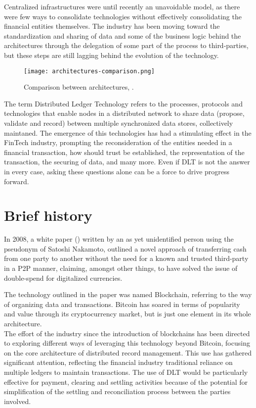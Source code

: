 Centralized infrastructures were until recently an unavoidable model, as there were few ways to consolidate technologies without effectively consolidating the financial entities themselves. The industry has been moving toward the standardization and sharing of data and some of the business logic behind the architectures through the delegation of some part of the process to third-parties, but these steps are still lagging behind the evolution of the technology. 

\begin{figure}[t]
    \centering
    \texttt{[image: architectures-comparison.png]}
    \caption{
        Comparison between architectures, \cite{cordawhitepaper}. 
        }
\end{figure}


The term Distributed Ledger Technology refers to the processes, protocols and technologies that enable nodes in a distributed network to share data (propose, validate and record) between multiple synchronized data stores, collectively maintaned. The emergence of this technologies has had a stimulating effect in the FinTech industry, prompting the reconsideration of the entities needed in a financial transaction, how should trust be established, the representation of the transaction, the securing of data, and many more. Even if DLT is not the answer in every case, asking these questions alone can be a force to drive progress forward.

\section{Brief history}
In 2008, a white paper (\cite{bitcoinpaper}) written by an as yet unidentified person using the pseudonym of Satoshi Nakamoto, outlined a novel approach of transferring cash from one party to another without the need for a known and trusted third-party in a P2P manner, claiming, amongst other things, to have solved the issue of double-spend for digitalized currencies. 


The technology outlined in the paper was named Blockchain, referring to the way of organizing data and transactions. Bitcoin has soared in terms of popularity and value through its cryptocurrency market, but is just one element in its whole architecture. \\

The effort of the industry since the introduction of blockchains has been directed to exploring different ways of leveraging this technology beyond Bitcoin, focusing on the core architecture of distributed record management. This use has gathered significant attention, reflecting the financial industry traditional reliance on multiple ledgers to maintain transactions. The use of DLT would be particularly effective for payment, clearing and settling activities because of the potential for simplification of the settling and reconciliation process between the parties involved. \\


